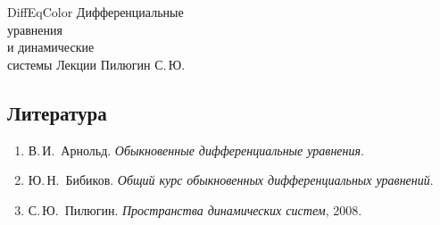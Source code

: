 \documentclass[12pt,a4paper]{article}
\begin{document}
	
	\makecover
	{DiffEqColor}
	{Дифференциальные \\ уравнения \\ и динамические \\ системы}
	{Лекции}
	{Пилюгин С.\,Ю.}
	
	\makestaffandcontents
	
	\newpage

	\subsection*{Литература}

	\begin{enumerate}
		\item В.\,И.~Арнольд. \emph{Обыкновенные дифференциальные уравнения}.
		\item Ю.\,Н.~Бибиков. \emph{Общий курс обыкновенных дифференциальных уравнений}.
		\item С.\,Ю.~Пилюгин. \emph{Пространства динамических систем}, 2008.
	\end{enumerate}	

	
	
\end{document}
